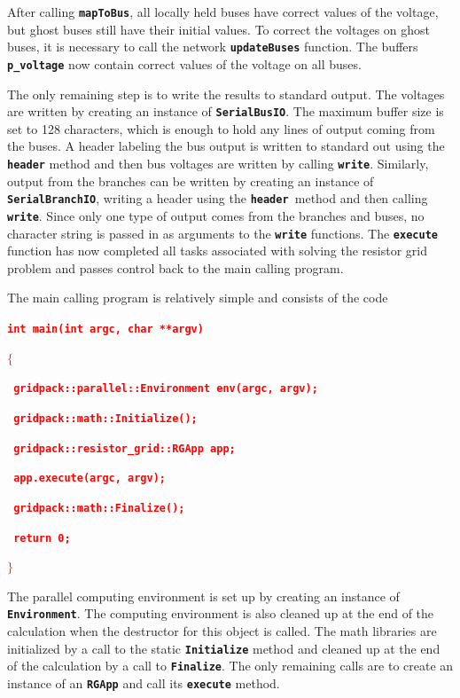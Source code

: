 \documentclass[12pt]{report} %
\begin{document}
After calling \texttt{\textbf{mapToBus}}, all locally held buses have correct values of the voltage, but ghost buses still have their initial values. To correct the voltages on ghost buses, it is necessary to call the network \texttt{\textbf{updateBuses}} function. The buffers \texttt{\textbf{p\_voltage}} now contain correct values of the voltage on all buses.

The only remaining step is to write the results to standard output. The voltages are written by creating an instance of \texttt{\textbf{SerialBusIO}}. The maximum buffer size is set to 128 characters, which is enough to hold any lines of output coming from the buses. A header labeling the bus output is written to standard out using the \texttt{\textbf{header}} method and then bus voltages are written by calling \texttt{\textbf{write}}. Similarly, output from the branches can be written by creating an instance of \texttt{\textbf{SerialBranchIO}}, writing a header using the \texttt{\textbf{header }}method and then calling \texttt{\textbf{write}}. Since only one type of output comes from the branches and buses, no character string is passed in as arguments to the \texttt{\textbf{write}} functions. The \texttt{\textbf{execute}} function has now completed all tasks associated with solving the resistor grid problem and passes control back to the main calling program.

The main calling program is relatively simple and consists of the code

\textcolor{red}{\texttt{\textbf{int main(int argc, char **argv)}}}

\textcolor{red}{\texttt{\textbf{$\boldsymbol{\mathrm{\{}}$}}}

\textcolor{red}{\texttt{\textbf{  gridpack::parallel::Environment env(argc, argv);}}}

\textcolor{red}{\texttt{\textbf{  gridpack::math::Initialize();}}}

\textcolor{red}{\texttt{\textbf{  gridpack::resistor\_grid::RGApp app;}}}

\textcolor{red}{\texttt{\textbf{  app.execute(argc, argv);}}}

\textcolor{red}{\texttt{\textbf{  gridpack::math::Finalize();}}}

\textcolor{red}{\texttt{\textbf{  return 0;}}}

\textcolor{red}{\texttt{\textbf{$\boldsymbol{\mathrm{\}}}$}}}

The parallel computing environment is set up by creating an instance of \texttt{\textbf{Environment}}. The computing environment is also cleaned up at the end of the calculation when the destructor for this object is called. The math libraries are initialized by a call to the static \texttt{\textbf{Initialize}} method and cleaned up at the end of the calculation by a call to \texttt{\textbf{Finalize}}. The only remaining calls are to create an instance of an \texttt{\textbf{RGApp}} and call its \texttt{\textbf{execute}} method.
\end{document}

